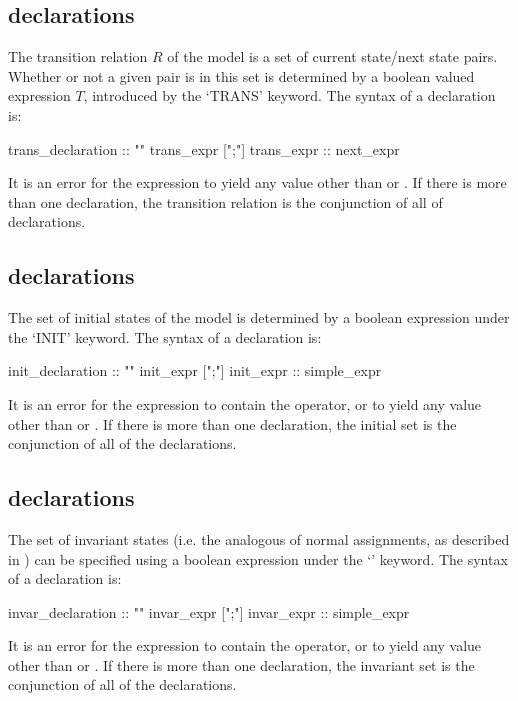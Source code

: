 \subsection{ declarations}
\label{TRANS declarations}
%
The transition relation $R$ of the model is a set of current
state/next state pairs. Whether or not a given pair is in this set is
determined by a boolean valued expression $T$, introduced by the
`TRANS' keyword. The syntax of a  declaration is:
%
\begin{Grammar}
trans_declaration :: "" trans_expr [";"]
trans_expr        :: next_expr
\end{Grammar}
%
It is an error for the expression to yield any value other than 
or . If there is more than one  declaration, the
transition relation is the conjunction of all of 
declarations.

\subsection{ declarations}
\label{INIT declaration}
%
The set of initial states of the model is determined by a boolean
expression under the `INIT' keyword. The syntax of a 
declaration is:
%
\begin{Grammar}
init_declaration :: "" init_expr [";"]
init_expr        :: simple_expr
\end{Grammar}
%
It is an error for the expression to contain the 
operator, or to yield any value other than  or . If
there is more than one  declaration, the initial set is the
conjunction of all of the  declarations.

\subsection{ declarations}
\label{INVAR declaration}
%
The set of invariant states (i.e. the analogous of normal assignments,
as described in ) can be specified using a
boolean expression under the `' keyword. The syntax of a
 declaration is:
%
\begin{Grammar}
invar_declaration :: "" invar_expr [";"]
invar_expr        :: simple_expr
\end{Grammar}
%
It is an error for the expression to contain the 
operator, or to yield any value other than  or . If
there is more than one  declaration, the invariant set is
the conjunction of all of the  declarations.


